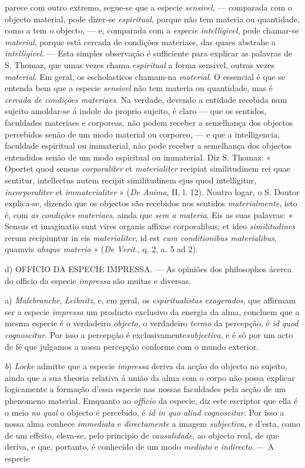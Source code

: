 parece com outro extremo, segue-se que a especie \emph{sensivel}, --- comparada com o objecto material, pode dizer-se \emph{espiritual}, porque não tem materia ou quantidade, como a tem o objecto, --- e, comparada com a \emph{especie intelligivel}, pode chamar-se \emph{material}, porque está cercada de condições materiaes, das quaes abstrahe a \emph{intelligivel}. --- Esta simples observação é sufficiente para explicar as palavras de S. Thomaz, que umas vezes chama \emph{espiritual} a forma sensivel, outras vezes \emph{material}. Em geral, os escholasticos chamam-na \emph{material}. O essencial é que se entenda bem que a especie \emph{sensivel} não tem materia ou quantidade, mas é \emph{cercada de condições materiaes}. Na verdade, devendo a entidade recebida num sujeito amoldar-se á indole do proprio sujeito, é claro --- que os sentidos, faculdades materiaes e corporeas, não podem receber a semelhança dos objectos percebidos senão de um modo material ou corporeo, --- e que a intelligencia, faculdade espiritual ou immaterial, não pode receber a semelhança dos objectos entendidos senão de um modo espiritual ou immaterial. Diz S. Thomaz: « Oportet quod sensus \emph{corporaliter} et \emph{materialiter} recipiat similitudinem rei quae sentitur, intellectus autem recipit similitudinem ejus quod intelligitur, \emph{incorporaliter} et \emph{immaterialiter} » (\emph{De Anima}, II, l. 12). Noutro logar, o S. Doutor explica-se, dizendo que os objectos são recebidos nos sentidos \emph{materialmente}, isto é, com \emph{as condições materiaes}, ainda que \emph{sem a materia}. Eis as suas palavras: « Sensus et imaginatio sunt vires organis affixae corporalibus; et ideo \emph{similitudines} rerum recipiuntur in eis \emph{materialiter}, id est \emph{cum conditionibus materialibus}, quamvis \emph{absque materia} » (\emph{De Verit}., q. 2, a. 5 ad 2).\par d) \textsc{OFFICIO} DA ESPECIE IMPRESSA. --- As opiniões dos philosophos ácerca do officio da especie \emph{impressa} são muitas e diversas.\par a) \emph{Malebranche}, \emph{Leibnitz}, e, em geral, os \emph{espiritualistas exagerados}, que affirmam ser a especie \emph{impressa} um producto exclusivo da energia da alma, concluem que a mesma especie é o verdadeiro \emph{objecto}, o verdadeiro \emph{termo} da percepção, é \emph{id quod cognoscitur}. Por isso a percepção é exclusivamente\emph{subjectiva}, e é só por um acto de fé que julgamos a nossa percepção conforme com o mundo exterior.\par \emph{b}) \emph{Locke} admitte que a especie \emph{impressa} deriva da acção do objecto no sujeito, ainda que a sua theoria relativa á união da alma com o corpo não possa explicar logicamente a formação d'essa especie nas nossas faculdades pela acção de um phenomeno material. Emquanto ao \emph{officio} da especie, diz este escriptor que ella é o meio \emph{no qual} o objecto é percebido, é \emph{id in quo aliud cognoscitur}. Por isso a nossa alma conhece \emph{immediata} e \emph{directamente} a imagem \emph{subjectiva}, e d'esta, como de um effeito, eleva-se, pelo principio de \emph{causalidade}, ao objecto real, de que deriva, e que, portanto, é conhecido de um modo \emph{mediato} e \emph{indirecto}. --- A especie 